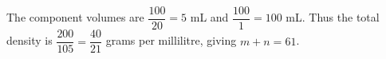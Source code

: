 The component volumes are $\dfrac{100}{20}=5$ mL and $\dfrac{100}{1}=100$ mL. Thus the total density is $\dfrac{200}{105}=\dfrac{40}{21}$ grams per millilitre, giving $m+n=\boxed{61}$.
